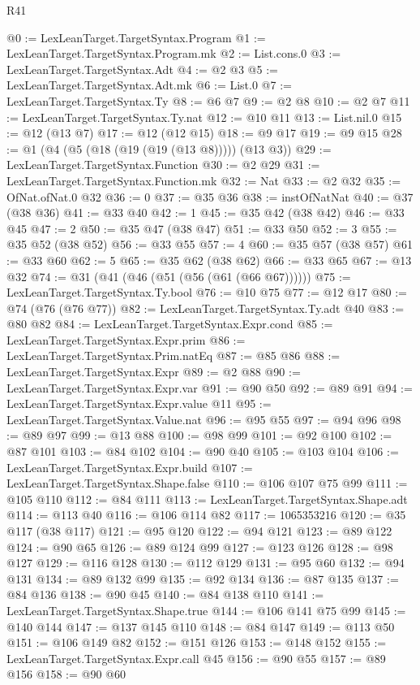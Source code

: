 \begin{lexlean}{R41}
\begin{coremodule}
@0 := LexLeanTarget.TargetSyntax.Program
@1 := LexLeanTarget.TargetSyntax.Program.mk
@2 := List.cons.{0}
@3 := LexLeanTarget.TargetSyntax.Adt
@4 := @2 @3
@5 := LexLeanTarget.TargetSyntax.Adt.mk
@6 := List.{0}
@7 := LexLeanTarget.TargetSyntax.Ty
@8 := @6 @7
@9 := @2 @8
@10 := @2 @7
@11 := LexLeanTarget.TargetSyntax.Ty.nat
@12 := @10 @11
@13 := List.nil.{0}
@15 := @12 (@13 @7)
@17 := @12 (@12 @15)
@18 := @9 @17
@19 := @9 @15
@28 := @1 (@4 (@5 (@18 (@19 (@19 (@13 @8))))) (@13 @3))
@29 := LexLeanTarget.TargetSyntax.Function
@30 := @2 @29
@31 := LexLeanTarget.TargetSyntax.Function.mk
@32 := Nat
@33 := @2 @32
@35 := OfNat.ofNat.{0} @32
@36 := 0
@37 := @35 @36
@38 := instOfNatNat
@40 := @37 (@38 @36)
@41 := @33 @40
@42 := 1
@45 := @35 @42 (@38 @42)
@46 := @33 @45
@47 := 2
@50 := @35 @47 (@38 @47)
@51 := @33 @50
@52 := 3
@55 := @35 @52 (@38 @52)
@56 := @33 @55
@57 := 4
@60 := @35 @57 (@38 @57)
@61 := @33 @60
@62 := 5
@65 := @35 @62 (@38 @62)
@66 := @33 @65
@67 := @13 @32
@74 := @31 (@41 (@46 (@51 (@56 (@61 (@66 @67))))))
@75 := LexLeanTarget.TargetSyntax.Ty.bool
@76 := @10 @75
@77 := @12 @17
@80 := @74 (@76 (@76 @77))
@82 := LexLeanTarget.TargetSyntax.Ty.adt @40
@83 := @80 @82
@84 := LexLeanTarget.TargetSyntax.Expr.cond
@85 := LexLeanTarget.TargetSyntax.Expr.prim
@86 := LexLeanTarget.TargetSyntax.Prim.natEq
@87 := @85 @86
@88 := LexLeanTarget.TargetSyntax.Expr
@89 := @2 @88
@90 := LexLeanTarget.TargetSyntax.Expr.var
@91 := @90 @50
@92 := @89 @91
@94 := LexLeanTarget.TargetSyntax.Expr.value @11
@95 := LexLeanTarget.TargetSyntax.Value.nat
@96 := @95 @55
@97 := @94 @96
@98 := @89 @97
@99 := @13 @88
@100 := @98 @99
@101 := @92 @100
@102 := @87 @101
@103 := @84 @102
@104 := @90 @40
@105 := @103 @104
@106 := LexLeanTarget.TargetSyntax.Expr.build
@107 := LexLeanTarget.TargetSyntax.Shape.false
@110 := @106 @107 @75 @99
@111 := @105 @110
@112 := @84 @111
@113 := LexLeanTarget.TargetSyntax.Shape.adt
@114 := @113 @40
@116 := @106 @114 @82
@117 := 1065353216
@120 := @35 @117 (@38 @117)
@121 := @95 @120
@122 := @94 @121
@123 := @89 @122
@124 := @90 @65
@126 := @89 @124 @99
@127 := @123 @126
@128 := @98 @127
@129 := @116 @128
@130 := @112 @129
@131 := @95 @60
@132 := @94 @131
@134 := @89 @132 @99
@135 := @92 @134
@136 := @87 @135
@137 := @84 @136
@138 := @90 @45
@140 := @84 @138 @110
@141 := LexLeanTarget.TargetSyntax.Shape.true
@144 := @106 @141 @75 @99
@145 := @140 @144
@147 := @137 @145 @110
@148 := @84 @147
@149 := @113 @50
@151 := @106 @149 @82
@152 := @151 @126
@153 := @148 @152
@155 := LexLeanTarget.TargetSyntax.Expr.call @45
@156 := @90 @55
@157 := @89 @156
@158 := @90 @60

\end{coremodule}
\end{lexlean}
